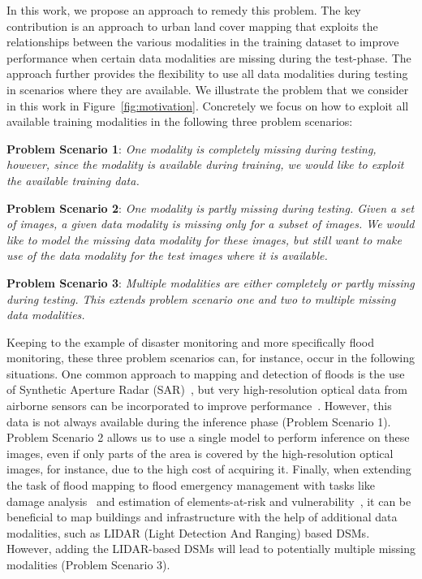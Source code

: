 \documentclass[journal]{IEEEtran}
\begin{document}
In this work, we propose an approach to remedy this problem. The key contribution is an approach to urban land cover mapping that exploits the relationships between the various modalities in the training dataset to improve performance when certain data modalities are missing during the test-phase. The approach further provides the flexibility to use all data modalities during testing in scenarios where they are available. We illustrate the problem that we consider in this work in Figure~\ref{fig:motivation}. Concretely we focus on how to exploit all available training modalities in the following three problem scenarios:

{\bf Problem Scenario 1}: \emph{One modality is completely missing during testing, however, since the modality is available during training, we would like to exploit the available training data.}

{\bf Problem Scenario 2}: \emph{One modality is partly missing during testing. Given a set of images, a given data modality is missing only for a subset of images. We would like to model the missing data modality for these images, but still want to make use of the data modality for the test images where it is available.}

{\bf Problem Scenario 3}: \emph{Multiple modalities are either completely or partly missing during testing. This extends problem scenario one and two to multiple missing data modalities.}

Keeping to the example of disaster monitoring and more specifically flood monitoring, these three problem scenarios can, for instance, occur in the following situations. One common approach to mapping and detection of floods is the use of Synthetic Aperture Radar (SAR)~\cite{serpico2012}, but very high-resolution optical data from airborne sensors can be incorporated to improve performance~\cite{serpico2012}. However, this data is not always available during the inference phase (Problem Scenario 1). Problem Scenario 2 allows us to use a single model to perform inference on these images, even if only parts of the area is covered by the high-resolution optical images, for instance, due to the high cost of acquiring it. Finally, when extending the task of flood mapping to flood emergency management with tasks like damage analysis~\cite{brunner2010, gueguen2015} and estimation of elements-at-risk and vulnerability~\cite{serpico2012}, it can be beneficial to map buildings and infrastructure with the help of additional data modalities, such as LIDAR (Light Detection And Ranging) based DSMs. However, adding the LIDAR-based DSMs will lead to potentially multiple missing modalities (Problem Scenario 3).
\end{document}
